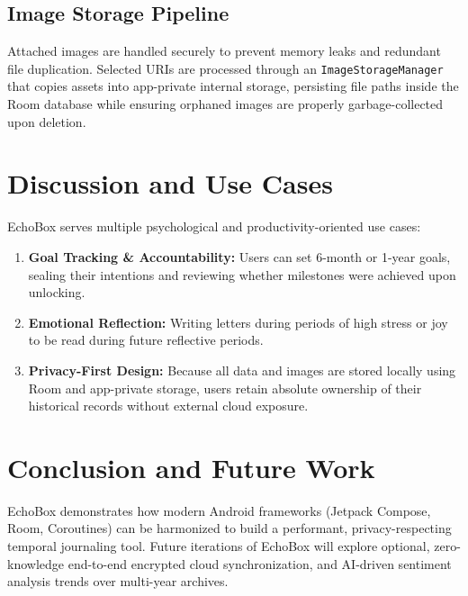 \documentclass[manuscript,screen]{acmart}
\begin{document}
\subsection{Image Storage Pipeline}
Attached images are handled securely to prevent memory leaks and redundant file duplication. Selected URIs are processed through an \texttt{ImageStorageManager} that copies assets into app-private internal storage, persisting file paths inside the Room database while ensuring orphaned images are properly garbage-collected upon deletion.

\section{Discussion and Use Cases}
EchoBox serves multiple psychological and productivity-oriented use cases:
\begin{enumerate}
    \item \textbf{Goal Tracking \& Accountability:} Users can set 6-month or 1-year goals, sealing their intentions and reviewing whether milestones were achieved upon unlocking.
    \item \textbf{Emotional Reflection:} Writing letters during periods of high stress or joy to be read during future reflective periods.
    \item \textbf{Privacy-First Design:} Because all data and images are stored locally using Room and app-private storage, users retain absolute ownership of their historical records without external cloud exposure.
\end{enumerate}

\section{Conclusion and Future Work}
EchoBox demonstrates how modern Android frameworks (Jetpack Compose, Room, Coroutines) can be harmonized to build a performant, privacy-respecting temporal journaling tool. Future iterations of EchoBox will explore optional, zero-knowledge end-to-end encrypted cloud synchronization, and AI-driven sentiment analysis trends over multi-year archives.
\end{document}
